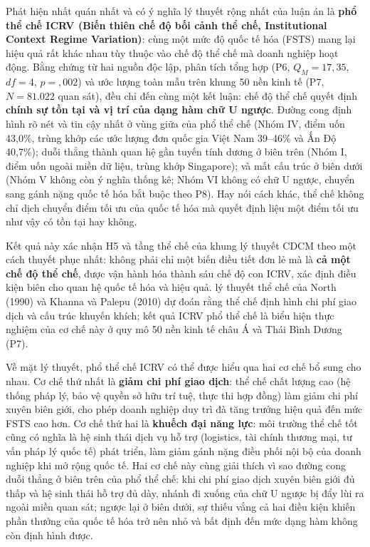 \documentclass[
  a4paper,
  13pt]{extreport}
\begin{document}
Phát hiện nhất quán nhất và có ý nghĩa lý thuyết rộng nhất của luận án
là \textbf{phổ thể chế ICRV (Biến thiên chế độ bối cảnh thể chế,
Institutional Context Regime Variation)}: cùng một mức độ quốc tế hóa
(FSTS) mang lại hiệu quả rất khác nhau tùy thuộc vào chế độ thể chế mà
doanh nghiệp hoạt động. Bằng chứng từ hai nguồn độc lập, phân tích tổng
hợp (P6, \(Q_M = 17{,}35\), \(df = 4\), \(p = {,}002\)) và ước lượng
toàn mẫu trên khung 50 nền kinh tế (P7, \(N = 81.022\) quan sát), đều
chỉ đến cùng một kết luận: chế độ thể chế quyết định \textbf{chính sự
tồn tại và vị trí của dạng hàm chữ U ngược}. Đường cong định hình rõ nét
và tin cậy nhất ở vùng giữa của phổ thể chế (Nhóm IV, điểm uốn 43,0\%,
trùng khớp các ước lượng đơn quốc gia Việt Nam 39--46\% và Ấn Độ
40,7\%); duỗi thẳng thành quan hệ gần tuyến tính dương ở biên trên (Nhóm
I, điểm uốn ngoài miền dữ liệu, trùng khớp Singapore); và mất cấu trúc ở
biên dưới (Nhóm V không còn ý nghĩa thống kê; Nhóm VI không có chữ U
ngược, chuyển sang gánh nặng quốc tế hóa bắt buộc theo P8). Hay nói cách
khác, thể chế không chỉ dịch chuyển điểm tối ưu của quốc tế hóa mà quyết
định liệu một điểm tối ưu như vậy có tồn tại hay không.

Kết quả này xác nhận H5 và tầng thể chế của khung lý thuyết CDCM theo
một cách thuyết phục nhất: không phải chỉ một biến điều tiết đơn lẻ mà
là \textbf{cả một chế độ thể chế}, được vận hành hóa thành sáu chế độ
con ICRV, xác định điều kiện biên cho quan hệ quốc tế hóa và hiệu quả.
lý thuyết thể chế của North (1990) và Khanna và Palepu (2010) dự đoán
rằng thể chế định hình chi phí giao dịch và cấu trúc khuyến khích; kết
quả ICRV phổ thể chế là biểu hiện thực nghiệm của cơ chế này ở quy mô 50
nền kinh tế châu Á và Thái Bình Dương (P7).

Về mặt lý thuyết, phổ thể chế ICRV có thể được hiểu qua hai cơ chế bổ
sung cho nhau. Cơ chế thứ nhất là \textbf{giảm chi phí giao dịch}: thể
chế chất lượng cao (hệ thống pháp lý, bảo vệ quyền sở hữu trí tuệ, thực
thi hợp đồng) làm giảm chi phí xuyên biên giới, cho phép doanh nghiệp
duy trì đà tăng trưởng hiệu quả đến mức FSTS cao hơn. Cơ chế thứ hai là
\textbf{khuếch đại năng lực}: môi trường thể chế tốt cũng có nghĩa là hệ
sinh thái dịch vụ hỗ trợ (logistics, tài chính thương mại, tư vấn pháp
lý quốc tế) phát triển, làm giảm gánh nặng điều phối nội bộ của doanh
nghiệp khi mở rộng quốc tế. Hai cơ chế này cùng giải thích vì sao đường
cong duỗi thẳng ở biên trên của phổ thể chế: khi chi phí giao dịch xuyên
biên giới đủ thấp và hệ sinh thái hỗ trợ đủ dày, nhánh đi xuống của chữ
U ngược bị đẩy lùi ra ngoài miền quan sát; ngược lại ở biên dưới, sự
thiếu vắng cả hai điều kiện khiến phần thưởng của quốc tế hóa trở nên
nhỏ và bất định đến mức dạng hàm không còn định hình được.
\end{document}
